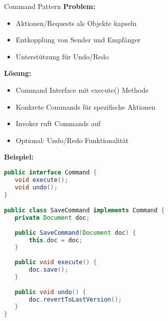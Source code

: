 \begin{definition}{Command Pattern}
\textbf{Problem:}
\begin{itemize}
   \item Aktionen/Requests als Objekte kapseln
   \item Entkopplung von Sender und Empfänger
   \item Unterstützung für Undo/Redo
\end{itemize}

\textbf{Lösung:}
\begin{itemize}
   \item Command Interface mit execute() Methode
   \item Konkrete Commands für spezifische Aktionen
   \item Invoker ruft Commands auf
   \item Optional: Undo/Redo Funktionalität
\end{itemize}

\textbf{Beispiel:}
\begin{lstlisting}[language=Java, style=basesmol]
public interface Command {
   void execute();
   void undo();
}

public class SaveCommand implements Command {
   private Document doc;
   
   public SaveCommand(Document doc) {
       this.doc = doc;
   }
   
   public void execute() {
       doc.save();
   }
   
   public void undo() {
       doc.revertToLastVersion();
   }
}
\end{lstlisting}
\end{definition}

